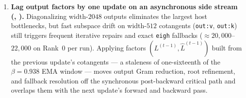 \begin{enumerate}
  outputs () defines an eigendecomposition-free speed bound via
  \texttt{gate}, \texttt{up}, \texttt{q}, and \texttt{k}.
\item \textbf{Lag output factors by one update on an asynchronous side stream
  (, ).} Diagonalizing width-$2048$ outputs
  eliminates the largest host bottlenecks, but fast subspace drift on width-$512$
  cotangents (\texttt{out:v}, \texttt{out:k}) still triggers frequent iterative
  repairs and exact \texttt{eigh} fallbacks ($\approx 20{,}000$--$22{,}000$ on
  Rank~0 per run). Applying factors $(L^{(t-1)},\hat L^{(t-1)})$ built from the
  previous update's cotangents --- a staleness of one-sixteenth of the
  $\beta=0.938$ EMA window --- moves output Gram reduction, root refinement, and
  fallback resolution off the synchronous post-backward critical path and
  overlaps them with the next update's forward and backward pass.
\end{enumerate}
